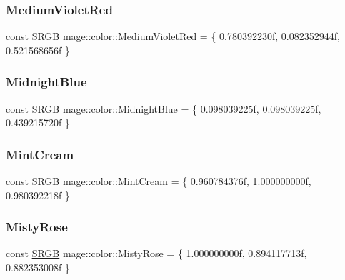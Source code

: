 \hypertarget{namespacemage_1_1color_a025756a0d147c1a4b91e275c91ea27ec}{}\label{namespacemage_1_1color_a025756a0d147c1a4b91e275c91ea27ec} 
\subsubsection{\texorpdfstring{Medium\+Violet\+Red}{MediumVioletRed}}
{\footnotesize\ttfamily const \hyperlink{structmage_1_1_s_r_g_b}{S\+R\+GB} mage\+::color\+::\+Medium\+Violet\+Red = \{ 0.\+780392230f, 0.\+082352944f, 0.\+521568656f \}}

\hypertarget{namespacemage_1_1color_a0216603e410d1bc24cafa0972b9bcc29}{}\label{namespacemage_1_1color_a0216603e410d1bc24cafa0972b9bcc29} 
\subsubsection{\texorpdfstring{Midnight\+Blue}{MidnightBlue}}
{\footnotesize\ttfamily const \hyperlink{structmage_1_1_s_r_g_b}{S\+R\+GB} mage\+::color\+::\+Midnight\+Blue = \{ 0.\+098039225f, 0.\+098039225f, 0.\+439215720f \}}

\hypertarget{namespacemage_1_1color_aa57f7772d74e242e8d98895bc43d87bd}{}\label{namespacemage_1_1color_aa57f7772d74e242e8d98895bc43d87bd} 
\subsubsection{\texorpdfstring{Mint\+Cream}{MintCream}}
{\footnotesize\ttfamily const \hyperlink{structmage_1_1_s_r_g_b}{S\+R\+GB} mage\+::color\+::\+Mint\+Cream = \{ 0.\+960784376f, 1.\+000000000f, 0.\+980392218f \}}

\hypertarget{namespacemage_1_1color_a6ae85af4c27f0e64ae516c2521b37c3c}{}\label{namespacemage_1_1color_a6ae85af4c27f0e64ae516c2521b37c3c} 
\subsubsection{\texorpdfstring{Misty\+Rose}{MistyRose}}
{\footnotesize\ttfamily const \hyperlink{structmage_1_1_s_r_g_b}{S\+R\+GB} mage\+::color\+::\+Misty\+Rose = \{ 1.\+000000000f, 0.\+894117713f, 0.\+882353008f \}}


